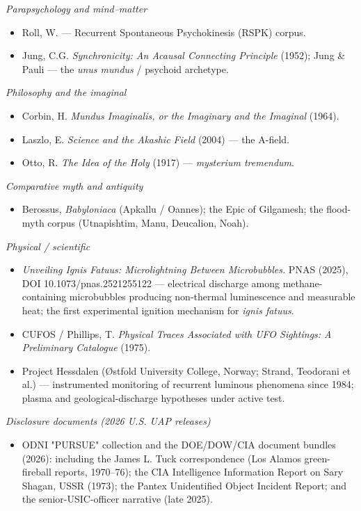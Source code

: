 \documentclass[11pt]{article}
\begin{document}
\emph{Parapsychology and mind--matter}

\begin{itemize}
\item Roll, W. --- Recurrent Spontaneous Psychokinesis (RSPK) corpus.
\item Jung, C.G. \emph{Synchronicity: An Acausal Connecting Principle} (1952); Jung \& Pauli --- the \emph{unus mundus} / psychoid archetype.
\end{itemize}

\emph{Philosophy and the imaginal}

\begin{itemize}
\item Corbin, H. \emph{Mundus Imaginalis, or the Imaginary and the Imaginal} (1964).
\item Laszlo, E. \emph{Science and the Akashic Field} (2004) --- the A-field.
\item Otto, R. \emph{The Idea of the Holy} (1917) --- \emph{mysterium tremendum}.
\end{itemize}

\emph{Comparative myth and antiquity}

\begin{itemize}
\item Berossus, \emph{Babyloniaca} (Apkallu / Oannes); the Epic of Gilgamesh; the flood-myth corpus (Utnapishtim, Manu, Deucalion, Noah).
\end{itemize}

\emph{Physical / scientific}

\begin{itemize}
\item \emph{Unveiling Ignis Fatuus: Microlightning Between Microbubbles.} PNAS (2025), DOI 10.1073/pnas.2521255122 --- electrical discharge among methane-containing microbubbles producing non-thermal luminescence and measurable heat; the first experimental ignition mechanism for \emph{ignis fatuus}.
\item CUFOS / Phillips, T. \emph{Physical Traces Associated with UFO Sightings: A Preliminary Catalogue} (1975).
\item Project Hessdalen (Østfold University College, Norway; Strand, Teodorani et al.) --- instrumented monitoring of recurrent luminous phenomena since 1984; plasma and geological-discharge hypotheses under active test.
\end{itemize}

\emph{Disclosure documents (2026 U.S. UAP releases)}

\begin{itemize}
\item ODNI "PURSUE" collection and the DOE/DOW/CIA document bundles (2026): including the James L. Tuck correspondence (Los Alamos green-fireball reports, 1970--76); the CIA Intelligence Information Report on Sary Shagan, USSR (1973); the Pantex Unidentified Object Incident Report; and the senior-USIC-officer narrative (late 2025).
\end{itemize}
\end{document}
